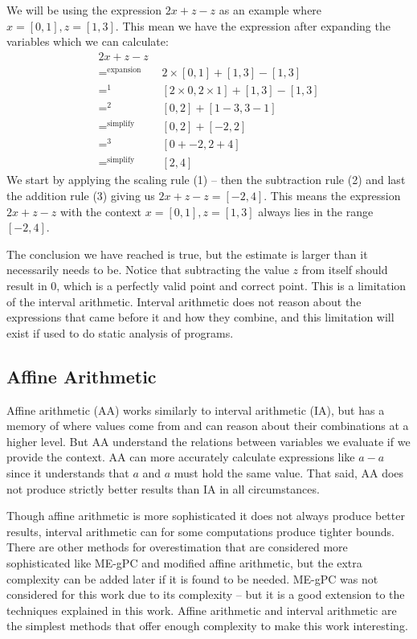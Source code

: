 We will be using the expression $2x + z - z$ as an example where $x = [0, 1], z = [1, 3]$. This mean we have the expression after expanding the variables which we can calculate:
\begin{align*}
  2x + z - z \\
  =^{\text{expansion}} \quad & 2 \times [0, 1] + [1, 3] - [1, 3] \\
  =^{1}                \quad & [2 \times 0, 2 \times 1] + [1, 3] - [1, 3] \\
  =^{2}                \quad & [0, 2] + [1 - 3, 3 - 1] \\
  =^{\text{simplify}}  \quad & [0, 2] + [-2, 2] \\
  =^{3}                \quad & [0 + -2, 2 + 4] \\
  =^{\text{simplify}}  \quad & [2, 4]
\end{align*}
We start by applying the scaling rule (1) -- then the subtraction rule (2) and last the addition rule (3) giving us $2x + z - z = [-2, 4]$. This means the expression $2x + z - z$ with the context $x = [0, 1], z = [1, 3]$ always lies in the range $[-2, 4]$.
\label{sec:prevResultIA}

The conclusion we have reached is true, but the estimate is larger than it necessarily needs to be. Notice that subtracting the value $z$ from itself should result in $0$, which is a perfectly valid point and correct point. This is a limitation of the interval arithmetic. Interval arithmetic does not reason about the expressions that came before it and how they combine, and this limitation will exist if used to do static analysis of programs. 

\subsection{Affine Arithmetic}
Affine arithmetic (AA) works similarly to interval arithmetic (IA), but has a memory of where values come from and can reason about their combinations at a higher level. But AA understand the relations between variables we evaluate if we provide the context. AA can more accurately calculate expressions like $a - a$ since it understands that $a$ and $a$ must hold the same value. That said, AA does not produce strictly better results than IA in all circumstances.\cite{src:affAri}

Though affine arithmetic is more sophisticated it does not always produce better results, interval arithmetic can for some computations produce tighter bounds. There are other methods for overestimation that are considered more sophisticated like ME-gPC \cite{src:MEgPC} and modified affine arithmetic, but the extra complexity can be added later if it is found to be needed. ME-gPC was not considered for this work due to its complexity -- but it is a good extension to the techniques explained in this work. Affine arithmetic and interval arithmetic are the simplest methods that offer enough complexity to make this work interesting.

